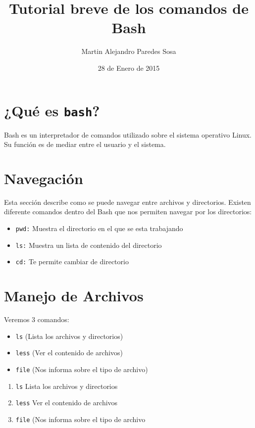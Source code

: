 \documentclass[12pt]{article}
\title{Tutorial breve de los comandos de Bash}
\author{Martin Alejandro Paredes Sosa}
\date{28 de Enero de 2015}
\begin{document}
\maketitle

\section{¿Qué es {\tt bash}?}

Bash es un interpretador de comandos utilizado sobre el sistema operativo Linux.
Su función es de mediar entre el usuario y el sistema.

\section{Navegación}

Esta sección describe como se puede navegar entre archivos y directorios.
Existen diferente comandos dentro del Bash que nos permiten navegar por los directorios:
\begin{itemize}
\item {\tt pwd:} Muestra el directorio en el que se esta trabajando
\item {\tt ls:} Muestra un lista de contenido del directorio
\item {\tt cd:} Te permite cambiar de directorio
\end{itemize}

\section{Manejo de Archivos}

Veremos 3 comandos:

\begin{itemize}
\item {\tt ls} (Lista los archivos y directorios) 
\item {\tt less} (Ver el contenido de archivos)
\item {\tt file} (Nos informa sobre el tipo de archivo)
\end{itemize}


\begin{enumerate}
\item {\tt ls} Lista los archivos y directorios
\item {\tt less} Ver el contenido de archivos
\item {\tt file} (Nos informa sobre el tipo de archivo
\end{enumerate}
\end{document}
